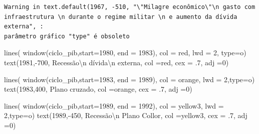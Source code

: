 \documentclass[
  letterpaper,
  DIV=11,
  numbers=noendperiod]{scrartcl}
\newenvironment{Shaded}{\begin{snugshade}}{\end{snugshade}}
\newcommand{\AttributeTok}[1]{\textcolor[rgb]{0.40,0.45,0.13}{#1}}
\newcommand{\DecValTok}[1]{\textcolor[rgb]{0.68,0.00,0.00}{#1}}
\newcommand{\FunctionTok}[1]{\textcolor[rgb]{0.28,0.35,0.67}{#1}}
\newcommand{\NormalTok}[1]{\textcolor[rgb]{0.00,0.23,0.31}{#1}}
\newcommand{\SpecialCharTok}[1]{\textcolor[rgb]{0.37,0.37,0.37}{#1}}
\newcommand{\StringTok}[1]{\textcolor[rgb]{0.13,0.47,0.30}{#1}}
\theoremstyle{definition}
\theoremstyle{definition}
\theoremstyle{plain}
\theoremstyle{plain}
\theoremstyle{remark}
\begin{document}
\begin{verbatim}
Warning in text.default(1967, -510, "\"Milagre econômico\"\n gasto com
infraestrutura \n durante o regime militar \n e aumento da dívida externa", :
parâmetro gráfico "type" é obsoleto
\end{verbatim}

\begin{Shaded}
\begin{Highlighting}[]
\FunctionTok{lines}\NormalTok{( }\FunctionTok{window}\NormalTok{(ciclo\_pib,}\AttributeTok{start=}\DecValTok{1980}\NormalTok{, }\AttributeTok{end =} \DecValTok{1983}\NormalTok{), }\AttributeTok{col =} \StringTok{\textquotesingle{}red\textquotesingle{}}\NormalTok{, }\AttributeTok{lwd =} \DecValTok{2}\NormalTok{, }\AttributeTok{type=}\StringTok{\textquotesingle{}o\textquotesingle{}}\NormalTok{)}
\FunctionTok{text}\NormalTok{(}\DecValTok{1981}\NormalTok{,}\SpecialCharTok{{-}}\DecValTok{700}\NormalTok{, }\StringTok{\textquotesingle{}Recessão}\SpecialCharTok{\textbackslash{}n}\StringTok{ dívida}\SpecialCharTok{\textbackslash{}n}\StringTok{ externa\textquotesingle{}}\NormalTok{, }\AttributeTok{col =}\StringTok{\textquotesingle{}red\textquotesingle{}}\NormalTok{, }\AttributeTok{cex =}\NormalTok{ .}\DecValTok{7}\NormalTok{, }\AttributeTok{adj =}\DecValTok{0}\NormalTok{) }

\FunctionTok{lines}\NormalTok{( }\FunctionTok{window}\NormalTok{(ciclo\_pib,}\AttributeTok{start=}\DecValTok{1983}\NormalTok{, }\AttributeTok{end =} \DecValTok{1989}\NormalTok{), }\AttributeTok{col =} \StringTok{\textquotesingle{}orange\textquotesingle{}}\NormalTok{, }\AttributeTok{lwd =} \DecValTok{2}\NormalTok{,}\AttributeTok{type=}\StringTok{\textquotesingle{}o\textquotesingle{}}\NormalTok{)}
\FunctionTok{text}\NormalTok{(}\DecValTok{1983}\NormalTok{,}\DecValTok{400}\NormalTok{, }\StringTok{\textquotesingle{}Plano cruzado\textquotesingle{}}\NormalTok{, }\AttributeTok{col =}\StringTok{\textquotesingle{}orange\textquotesingle{}}\NormalTok{, }\AttributeTok{cex =}\NormalTok{ .}\DecValTok{7}\NormalTok{, }\AttributeTok{adj =}\DecValTok{0}\NormalTok{) }

\FunctionTok{lines}\NormalTok{( }\FunctionTok{window}\NormalTok{(ciclo\_pib,}\AttributeTok{start=}\DecValTok{1989}\NormalTok{, }\AttributeTok{end =} \DecValTok{1992}\NormalTok{), }\AttributeTok{col =} \StringTok{\textquotesingle{}yellow3\textquotesingle{}}\NormalTok{, }\AttributeTok{lwd =} \DecValTok{2}\NormalTok{,}\AttributeTok{type=}\StringTok{\textquotesingle{}o\textquotesingle{}}\NormalTok{)}
\FunctionTok{text}\NormalTok{(}\DecValTok{1989}\NormalTok{,}\SpecialCharTok{{-}}\DecValTok{450}\NormalTok{, }\StringTok{\textquotesingle{}Recessão}\SpecialCharTok{\textbackslash{}n}\StringTok{ Plano Collor\textquotesingle{}}\NormalTok{, }\AttributeTok{col =}\StringTok{\textquotesingle{}yellow3\textquotesingle{}}\NormalTok{, }\AttributeTok{cex =}\NormalTok{ .}\DecValTok{7}\NormalTok{, }\AttributeTok{adj =}\DecValTok{0}\NormalTok{) }


\end{Highlighting}
\end{Shaded}
\end{document}
